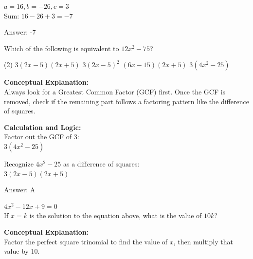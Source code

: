 \documentclass[11pt,paper=a4,answers]{exam}
\begin{document}
\begin{questions}
\begin{solution}
\vspace{10pt}

$a = 16, b = -26, c = 3$ \\
Sum: $16 - 26 + 3 = -7$

\vspace{25pt}

Answer: \colorbox{yellow!100}{-7}
\end{solution}

\vspace{40pt}

\question
Which of the following is equivalent to $12x^2 - 75$?
\begin{tasks}(2)
    \task $3(2x - 5)(2x + 5)$
    \task $3(2x - 5)^2$
    \task $(6x - 15)(2x + 5)$
    \task $3(4x^2 - 25)$
\end{tasks}

\begin{solution}
\textbf{Conceptual Explanation:} \\
Always look for a Greatest Common Factor (GCF) first. Once the GCF is removed, check if the remaining part follows a factoring pattern like the difference of squares.

\vspace{20pt}

\textbf{Calculation and Logic:} \\
Factor out the GCF of 3: \\
$3(4x^2 - 25)$

\vspace{10pt}

Recognize $4x^2 - 25$ as a difference of squares: \\
$3(2x - 5)(2x + 5)$

\vspace{25pt}

Answer: \colorbox{yellow!100}{A}
\end{solution}

\vspace{40pt}

\question
$4x^2 - 12x + 9 = 0$ \\
If $x = k$ is the solution to the equation above, what is the value of $10k$?

\begin{solution}
\textbf{Conceptual Explanation:} \\
Factor the perfect square trinomial to find the value of $x$, then multiply that value by 10.


\end{solution}
\end{questions}
\end{document}
